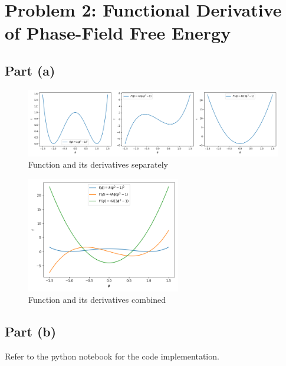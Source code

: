 \documentclass[12pt]{article}
\begin{document}
\section*{Problem 2: Functional Derivative of Phase-Field Free Energy}
\subsection*{Part (a)}
\begin{figure}[h]
    \centering
    \includegraphics[width=1.0\textwidth]{images/function_sketch.png}
    \caption{Function and its derivatives separately}
\end{figure}
\begin{figure}[h]
    \centering
    \includegraphics[width=0.6\textwidth]{images/function_sketch_all.png}
    \caption{Function and its derivatives combined}
\end{figure}

\subsection*{Part (b)}
Refer to the python notebook for the code implementation.
\end{document}
